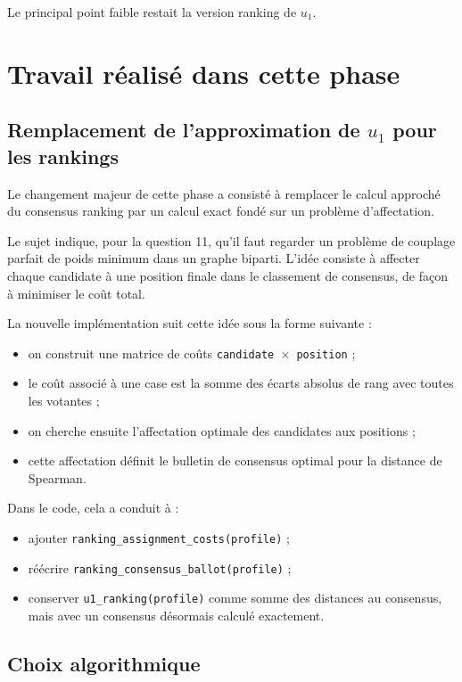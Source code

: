 \documentclass[11pt,a4paper]{article}
\begin{document}
Le principal point faible restait la version ranking de \(u_1\).

\section{Travail r\'ealis\'e dans cette phase}

\subsection{Remplacement de l'approximation de \texorpdfstring{$u_1$}{u1} pour les rankings}

Le changement majeur de cette phase a consist\'e \`a remplacer le calcul approch\'e du consensus ranking par un calcul exact fond\'e sur un probl\`eme d'affectation.

Le sujet indique, pour la question 11, qu'il faut regarder un probl\`eme de couplage parfait de poids minimum dans un graphe biparti. L'id\'ee consiste \`a affecter chaque candidate \`a une position finale dans le classement de consensus, de fa\c{c}on \`a minimiser le co\^ut total.

La nouvelle impl\'ementation suit cette id\'ee sous la forme suivante :
\begin{itemize}[leftmargin=*]
    \item on construit une matrice de co\^uts \texttt{candidate $\times$ position} ;
    \item le co\^ut associ\'e \`a une case est la somme des \'ecarts absolus de rang avec toutes les votantes ;
    \item on cherche ensuite l'affectation optimale des candidates aux positions ;
    \item cette affectation d\'efinit le bulletin de consensus optimal pour la distance de Spearman.
\end{itemize}

Dans le code, cela a conduit \`a :
\begin{itemize}[leftmargin=*]
    \item ajouter \texttt{ranking\_assignment\_costs(profile)} ;
    \item r\'e\'ecrire \texttt{ranking\_consensus\_ballot(profile)} ;
    \item conserver \texttt{u1\_ranking(profile)} comme somme des distances au consensus, mais avec un consensus d\'esormais calcul\'e exactement.
\end{itemize}

\subsection{Choix algorithmique}
\end{document}
